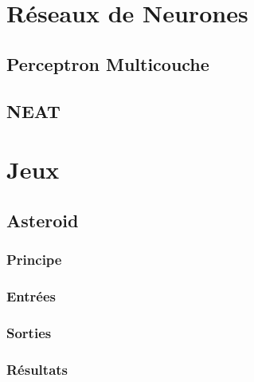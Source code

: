 \documentclass{article}
\begin{document}
\section{Réseaux de Neurones}
\subsection{Perceptron Multicouche}
\subsection{NEAT}

\section{Jeux}
\subsection{Asteroid}
\subsubsection{Principe}
\subsubsection{Entrées}
\subsubsection{Sorties}
\subsubsection{Résultats}
\end{document}
